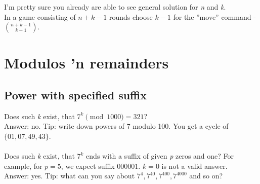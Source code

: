 \documentclass[12pt]{article}
\begin{document}
I'm pretty sure you already are able to see general solution for \textit{n} and \textit{k}.\\
In a game consisting of $n+k-1$ rounds choose $k-1$ for the ''move'' command - ${n+k-1}\choose{k-1}$.

\section{Modulos 'n remainders}
\subsection{Power with specified suffix}
Does such \textit{k} exist, that $7^k \pmod{1000} = 321$?\\
Answer: no. Tip: write down powers of 7 modulo 100. You get a cycle of $\{01, 07, 49, 43\}$.\\\\
Does such \textit{k} exist, that $7^k$ ends with a suffix of given \textit{p} zeros and one? For example, for $p=5$, we expect suffix $000001$. $k=0$ is not a valid answer.\\
Answer: yes. Tip: what can you say about $7^4, 7^{40}, 7^{400}, 7^{4000}$ and so on?
\end{document}
